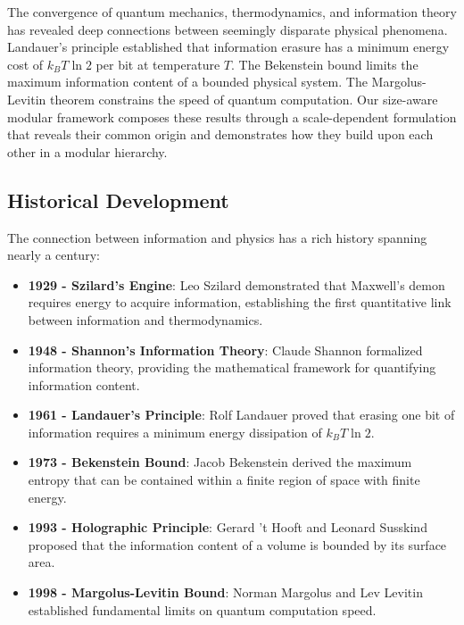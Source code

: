 \documentclass[11pt,a4paper]{article}
\theoremstyle{definition}
\begin{document}
The convergence of quantum mechanics, thermodynamics, and information theory has revealed deep connections between seemingly disparate physical phenomena. Landauer's principle established that information erasure has a minimum energy cost of $k_B T \ln 2$ per bit at temperature $T$. The Bekenstein bound limits the maximum information content of a bounded physical system. The Margolus-Levitin theorem constrains the speed of quantum computation. Our size-aware modular framework composes these results through a scale-dependent formulation that reveals their common origin and demonstrates how they build upon each other in a modular hierarchy.

\subsection{Historical Development}

The connection between information and physics has a rich history spanning nearly a century:

\begin{itemize}
\item \textbf{1929 - Szilard's Engine}: Leo Szilard demonstrated that Maxwell's demon requires energy to acquire information, establishing the first quantitative link between information and thermodynamics.

\item \textbf{1948 - Shannon's Information Theory}: Claude Shannon formalized information theory, providing the mathematical framework for quantifying information content.

\item \textbf{1961 - Landauer's Principle}: Rolf Landauer proved that erasing one bit of information requires a minimum energy dissipation of $k_B T \ln 2$.

\item \textbf{1973 - Bekenstein Bound}: Jacob Bekenstein derived the maximum entropy that can be contained within a finite region of space with finite energy.

\item \textbf{1993 - Holographic Principle}: Gerard 't Hooft and Leonard Susskind proposed that the information content of a volume is bounded by its surface area.

\item \textbf{1998 - Margolus-Levitin Bound}: Norman Margolus and Lev Levitin established fundamental limits on quantum computation speed.
\end{itemize}
\end{document}
